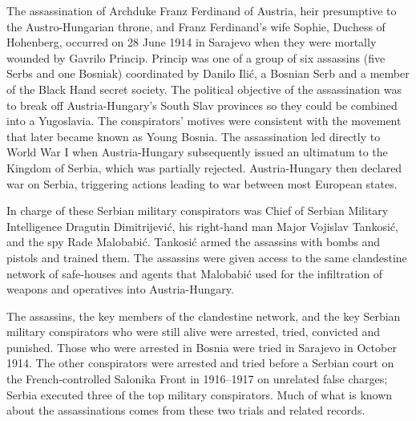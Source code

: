 \documentclass{article}
\date{\today}
\begin{document}
\maketitle

\begin{multicols}{3}{


\begin{window} The assassination of Archduke Franz Ferdinand of Austria, heir presumptive to the Austro-Hungarian throne, and Franz Ferdinand's wife Sophie, Duchess of Hohenberg, occurred on 28 June 1914 in Sarajevo when they were mortally wounded by Gavrilo Princip. Princip was one of a group of six assassins (five Serbs and one Bosniak) coordinated by Danilo Ilić, a Bosnian Serb and a member of the Black Hand secret society. The political objective of the assassination was to break off Austria-Hungary's South Slav provinces so they could be combined into a Yugoslavia. The conspirators' motives were consistent with the movement that later became known as Young Bosnia. The assassination led directly to World War I when Austria-Hungary subsequently issued an ultimatum to the Kingdom of Serbia, which was partially rejected. Austria-Hungary then declared war on Serbia, triggering actions leading to war between most European states.

In charge of these Serbian military conspirators was Chief of Serbian Military Intelligence Dragutin Dimitrijević, his right-hand man Major Vojislav Tankosić, and the spy Rade Malobabić. Tankosić armed the assassins with bombs and pistols and trained them. The assassins were given access to the same clandestine network of safe-houses and agents that Malobabić used for the infiltration of weapons and operatives into Austria-Hungary.

\end{window}

\begin{window} The assassins, the key members of the clandestine network, and the key Serbian military conspirators who were still alive were arrested, tried, convicted and punished. Those who were arrested in Bosnia were tried in Sarajevo in October 1914. The other conspirators were arrested and tried before a Serbian court on the French-controlled Salonika Front in 1916–1917 on unrelated false charges; Serbia executed three of the top military conspirators. Much of what is known about the assassinations comes from these two trials and related records.


\end{window}}
\end{multicols}
\end{document}
